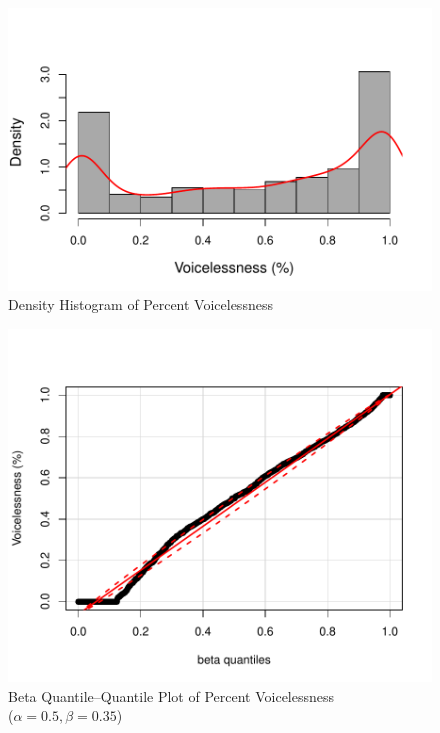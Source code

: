 \documentclass[a4paper]{article}
\begin{document}
\begin{figure}[h!]
  \begin{center}
    \begin{minipage}[t]{0.6\linewidth}
      \begin{center}
\includegraphics{prelim-038}
      \end{center}
    \end{minipage}
    \caption{Density Histogram of Percent Voicelessness}
    \label{fig:vls_hist}
  \end{center}
\end{figure}

\begin{figure}[h!]
  \begin{center}
    \begin{minipage}[t]{0.6\linewidth}
      \begin{center}
\includegraphics{prelim-040}
      \end{center}
    \end{minipage}
    \caption{Beta Quantile--Quantile Plot of Percent Voicelessness\\
      ($\alpha=0.5, \beta=0.35$)}
    \label{fig:vls_qq}
  \end{center}
\end{figure}
\end{document}
